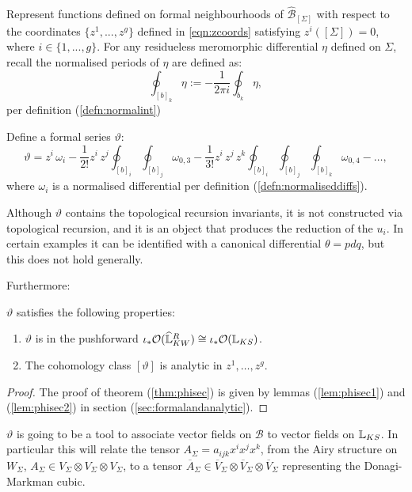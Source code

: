     Represent functions defined on formal neighbourhoods of \(\widehat{\mathcal{B}}_{[\Sigma]}\) with respect to the coordinates \(\{z^1,...,z^g\}\) defined in \eqref{eqn:zcoords} satisfying \(z^i([\Sigma])=0\), where \(i  \in \{1,...,g\}\).  For any residueless meromorphic differential \(\eta\) defined on \(\Sigma\), recall the normalised periods of \( \eta\) are defined as:
    \[ \oint_{[b]_k} \eta:=-\frac{1}{2\pi i}\oint_{b_k}\eta, \]
    per definition (\ref{defn:normalint})
    \begin{defn}[\(\vartheta\)] 
    \label{defn:thetaTR}
    Define a formal series \( \vartheta\):
    \begin{equation} 
        \vartheta = z^i\, \omega_i-\frac{1}{2!} z^i \, z^j \oint_{[b]_i} \oint_{[b]_j}\omega_{0,3}-\frac{1}{3!}z^i\,z^j\, z^k\oint_{[b]_i}\oint_{[b]_j}\oint_{[b]_k}\omega_{0,4}- \dots ,
    \end{equation}
    where \( \omega_i\) is a normalised differential per definition (\ref{defn:normaliseddiffs}).
    
    \begin{rem} Although \( \vartheta\) contains the topological recursion invariants, it is not constructed via topological recursion, and it is an object that produces the reduction of the \(u_i\). In certain examples it can be identified with a canonical differential \( \theta = p dq\), but this does not hold generally.  
    \end{rem}
    
    \end{defn}
    Furthermore:
    \begin{thm}
    \label{thm:phisec}   
    \( \vartheta\) satisfies the following properties:
    \begin{enumerate}
        \item \( \vartheta \) is in the pushforward \( \iota_{*}  \mathcal{O}( \widehat{\mathbb{L}}^R_{KW}) \cong   \iota_{*}  \mathcal{O}( \mathbb{L}_{KS}) \).
        \item The cohomology class \( [\vartheta]\) is analytic in \( z^1, \dots , z^g\).
    \end{enumerate}
    \end{thm}
    
    \begin{proof}
    The proof of theorem (\ref{thm:phisec}) is given by lemmas (\ref{lem:phisec1}) and (\ref{lem:phisec2}) in section (\ref{sec:formalandanalytic}). 
    \end{proof} 
    
    \( \vartheta\) is going to be a tool to associate vector fields on \( \mathcal{B}\) to vector fields on \( \mathbb{L}_{KS}\). In particular this will relate the tensor \(A_\Sigma = a_{ijk}x^i x^j x^k\), from the Airy structure on \(W_\Sigma\), \(A_\Sigma \in V_\Sigma \otimes V_\Sigma \otimes V_\Sigma\), to a tensor \( \overline{A}_\Sigma \in \overline{V}_\Sigma \otimes \overline{V}_\Sigma \otimes  \overline{V}_\Sigma\) representing the Donagi-Markman cubic.
    
